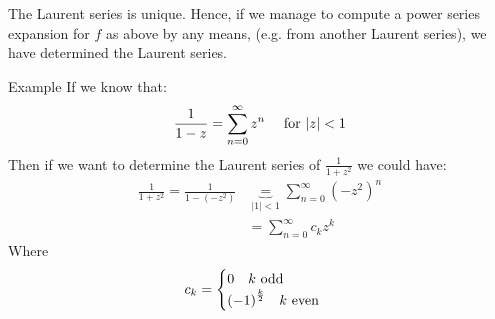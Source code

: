 \begin{framedremark}
    The Laurent series is unique. Hence, if we manage to compute a power series expansion for $f$ as above by any means, (e.g. from another Laurent series), we have determined the Laurent series.
\end{framedremark}
\begin{parag}{Example}
	If we know that:
	\begin{align*} 
		\frac{1}{ 1 - z} = \sum_{n= 0}^{\infty}z^{n} \mathspace \text{ for } \left|z\right| < 1
	\end{align*}
	Then if we want to determine the Laurent series of $\frac{1}{1 + z^2}$ we could have:
	\begin{align*} 
		\frac{1}{1 + z^2} = \frac{1}{1- \left(-z^2\right)} &\underbrace{=}_{\left|1\right| < 1} \sum_{n= 0}^{\infty} \left(-z^2\right)^{n}\\
		&= \sum_{n= 0}^{\infty} c_kz^{k}
	\end{align*}
	Where
	\begin{align*} 
		c_k = \begin{cases}
			0 \mathspace k \text{ odd}\\
			\left(-1\right)^{\frac{k}{2}} \mathspace k \text{ even}
		\end{cases}
	\end{align*}
    
\end{parag}

